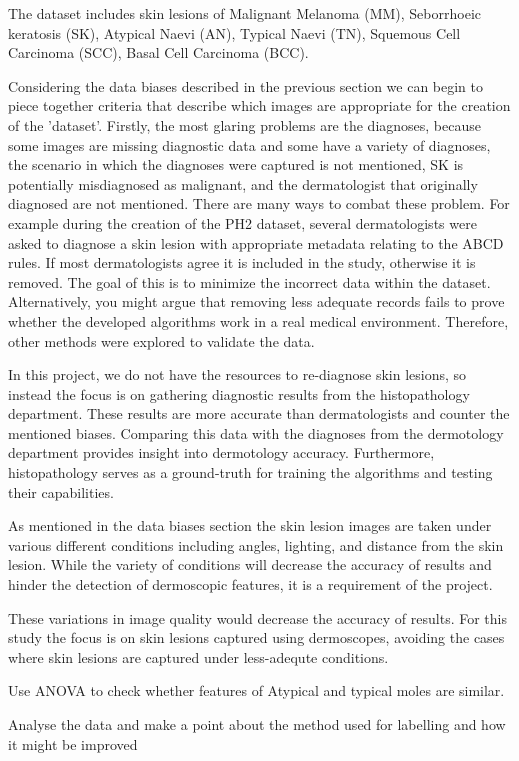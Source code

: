 The dataset includes skin lesions of Malignant Melanoma (MM), Seborrhoeic keratosis (SK), Atypical Naevi (AN), Typical Naevi (TN), Squemous Cell Carcinoma (SCC), Basal Cell Carcinoma (BCC). 

Considering the data biases described in the previous section we can begin to piece together criteria that describe which images are appropriate for the creation of the 'dataset'. Firstly, the most glaring problems are the diagnoses, because some images are missing diagnostic data and some have a variety of diagnoses, the scenario in which the diagnoses were captured is not mentioned, 
SK is potentially misdiagnosed as malignant, and the dermatologist that originally diagnosed are not mentioned. There are many ways to combat these problem. For example during the creation of the PH2 dataset\cite{mendonca2013}, several dermatologists were asked to diagnose a skin lesion with appropriate metadata relating to the ABCD rules. If most dermatologists agree it is included in the study, otherwise it is removed. The goal of this is to minimize the incorrect data within the dataset. Alternatively, you might argue that removing less adequate records fails to prove whether the developed algorithms work in a real medical environment. Therefore, other methods were explored to validate the data.

In this project, we do not have the resources to re-diagnose skin lesions, so instead the focus is on gathering diagnostic results from the histopathology department. These results are more accurate than dermatologists\cite{} and counter the mentioned biases. Comparing this data with the diagnoses from the dermotology department provides insight into dermotology accuracy. Furthermore, histopathology serves as a ground-truth for training the algorithms and testing their capabilities.

As mentioned in the data biases section the skin lesion images are taken under various different conditions including angles, lighting, and distance from the skin lesion. While the variety of conditions will decrease the accuracy of results and hinder the detection of dermoscopic features, it is a requirement of the project. 

These variations in image quality would decrease the accuracy of results. For this study the focus is on skin lesions captured using dermoscopes, avoiding the cases where skin lesions are captured under less-adequte conditions.


Use ANOVA to check whether features of Atypical and typical moles are similar.







Analyse the data and make a point about the method used for labelling and how it might be improved
